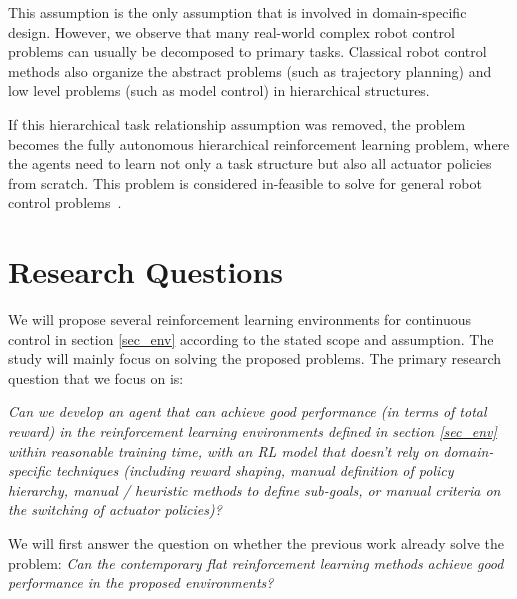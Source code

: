 This assumption is the only assumption that is involved in domain-specific design. However, we observe that many real-world complex robot control problems can usually be decomposed to primary tasks. Classical robot control methods also organize the abstract problems (such as trajectory planning) and low level problems (such as model control) in hierarchical structures.

If this hierarchical task relationship assumption was removed, the problem becomes the fully autonomous hierarchical reinforcement learning problem, where the agents need to learn not only a task structure but also all actuator policies from scratch. This problem is considered in-feasible to solve for general robot control problems~\cite{barto2003recent}.


\section{Research Questions}

We will propose several reinforcement learning environments for continuous control in section \ref{sec_env} according to the stated scope and assumption. The study will mainly focus on solving the proposed problems.
The primary research question that we focus on is:
\begin{center}
    \textit{Can we develop an agent that can achieve good performance (in terms of total reward) in the reinforcement learning environments defined in section \ref{sec_env} within reasonable training time, with an RL model that doesn't rely on domain-specific techniques (including reward shaping, manual definition of policy hierarchy, manual / heuristic methods to define sub-goals, or manual criteria on the switching of actuator policies)?}
\end{center}

We will first answer the question on whether the previous work already solve the problem: \textit{Can the contemporary flat reinforcement learning methods achieve good performance in the proposed environments?}



